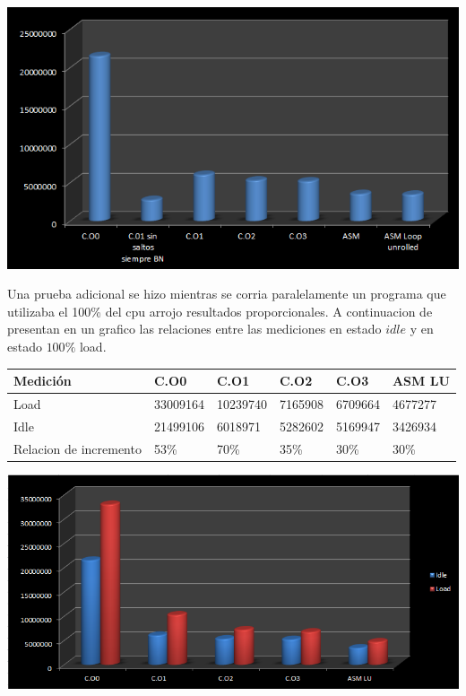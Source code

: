 \includegraphics[scale=1]{imagenes/fcolor-grafico.png} 

\par
\bigskip
Una prueba adicional se hizo mientras se corria paralelamente un programa que utilizaba el 100\% del cpu arrojo resultados proporcionales. A continuacion de presentan en un grafico las relaciones entre las mediciones en estado $idle$ y en estado $100\%$ load.\\

\begin{center}
    \begin{tabular}{|l|l|l|l|l|l|}
        \hline
        Medición  & C.O0  & C.O1 & C.O2  & C.O3  & ASM LU  \\
        \hline
        Load & 33009164& 10239740  &7165908& 6709664 &4677277 \\
        \hline
        Idle & 21499106 & 6018971 & 5282602 & 5169947 & 3426934 \\
        \hline
        Relacion de incremento & 53\% & 70\% & 35\% & 30\% & 30\% \\
        \hline
    \end{tabular}
\end{center}
\includegraphics[scale=0.85]{imagenes/fcolor-grafico2.png} 

